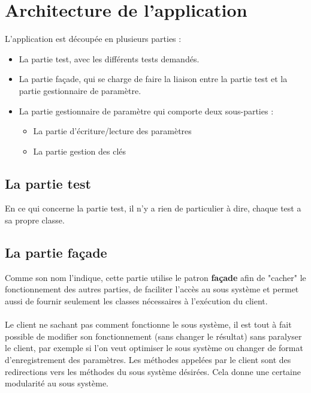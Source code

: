 \documentclass[12pt]{article}
\begin{document}
\newpage
\tableofcontents
\newpage

\section{Architecture de l'application}
\label{sec:arch_app}

	L'application est découpée en plusieurs parties : 
	\begin{itemize}
		\item La partie test, avec les différents tests demandés.
		\item La partie façade, qui se charge de faire la liaison entre la partie test et la partie gestionnaire de paramètre.
		\item La partie gestionnaire de paramètre qui comporte deux sous-parties :
		\begin{itemize}
			\item La partie d'écriture/lecture des paramètres
			\item La partie gestion des clés
		\end{itemize}
	\end{itemize}
	\subsection{La partie test}
	
	En ce qui concerne la partie test, il n'y a rien de particulier à dire, chaque test a sa propre classe.
	
	\subsection{La partie façade}

	Comme son nom l'indique, cette partie utilise le patron \textbf{façade} afin de "cacher" le fonctionnement des autres parties, de faciliter l'accès au sous système et permet aussi de fournir seulement les classes nécessaires à l'exécution du client.
	
	\paragraph{}
	Le client ne sachant pas comment fonctionne le sous système, il est tout à fait possible de modifier son fonctionnement (sans changer le résultat) sans paralyser le client, par exemple si l'on veut optimiser le sous système ou changer de format d'enregistrement des paramètres. Les méthodes appelées par le client sont des redirections vers les méthodes du sous système désirées. Cela donne une certaine modularité au sous système.
	
\end{document}
